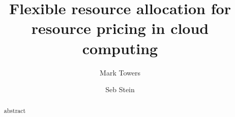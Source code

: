 \documentclass[sigconf]{aamas}
\begin{document}
    \title{Flexible resource allocation for resource pricing in cloud computing}  %

    \author{Mark Towers}

    \author{Seb Stein}

    \begin{abstract}
        abstract %
    \end{abstract}


    \maketitle

    

    
    
\end{document}
